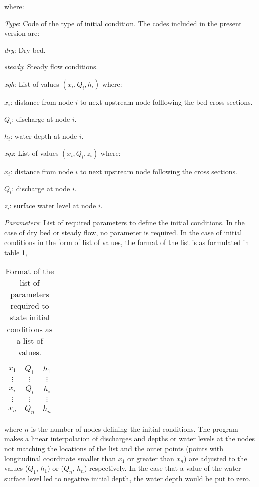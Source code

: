 \documentclass[a4paper,12pt]{article}
\newcommand{\TABLE}[4]
{
	\begin{table}[ht!]\centering
	\begin{tabular}{#1}\hline#2\\\hline\end{tabular}
	\caption{#3.\label{#4}}\end{table}
}
\begin{document}
where:
\begin{description}
\item\emph{Type}: Code of the type of initial condition. The codes included
in the present version are:
\begin{description}
\item\emph{dry}: Dry bed.
\item\emph{steady}: Steady flow conditions.
\item\emph{xqh}: List of values $(x_i,Q_i,h_i)$ where:
\begin{description}
\item $x_i$: distance from node $i$ to next upstream node folllowing the bed
cross sections.
\item $Q_i$: discharge at node $i$.
\item $h_i$: water depth at node $i$.
\end{description}
\item\emph{xqz}: List of values $(x_i,Q_i,z_i)$ where:
\begin{description}
\item $x_i$: distance from node $i$ to next upstream node following the cross
sections.
\item $Q_i$: discharge at node $i$.
\item $z_i$: surface water level at node $i$.
\end{description}
\end{description}
\item\emph{Parameters}: List of required parameters to define the initial
conditions.  In the case of dry bed or steady flow, no parameter is required. In
the case of initial conditions in the form of list of values, the format of the
list is as formulated in table \ref{TabCIParametros},
\TABLE{ccc}
{
	$x_1$&$Q_1$&$h_1$\\$\vdots$&$\vdots$&$\vdots$\\
	$x_i$&$Q_i$&$h_i$\\$\vdots$&$\vdots$&$\vdots$\\
	$x_n$&$Q_n$&$h_n$
}{Format of the list of parameters required to state initial conditions as a
list of values}{TabCIParametros}
where $n$ is the number of nodes defining the initial conditions. The program
makes a linear interpolation of discharges and depths or water levels at the
nodes not matching the locations of the list and the outer points (points with longitudinal coordinate smaller than $x_1$ or greater than $x_n$) are adjusted to the values ($Q_1$, $h_1$) or ($Q_n$, $h_n$) respectively. In the case that a value
of the water surface level led to negative initial depth, the water depth would
be put to zero.
\end{description}
\end{document}
